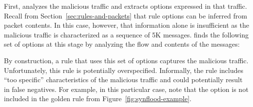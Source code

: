 \documentclass[sigconf,review, anonymous]{acmart}
\begin{document}
First, \tname{} analyzes the malicious traffic and extracts options
expressed in that traffic. Recall from
Section~\ref{sec:rules-and-packets} that rule options can be inferred
from packet contents. In this case, however, that information alone is
insufficient as the malicious traffic is characterized as a sequence
of 5K
messages. \tname{} finds the following set of options at this stage by
analyzing the flow and contents of the messages:

\begin{figure}[h]
  \vspace{-2ex}
  
  \vspace{-2ex}  
\end{figure}


\noindent
By construction, a rule that uses this set of options captures the
malicious traffic. Unfortunately, this rule is potentially
overspecified. Informally, the rule includes ``too specific''
characteristics of the malicious traffic and could potentially result
in false negatives. For example, in this particular case, note that
the option  is not included in the golden rule
from Figure~\ref{fig:synflood-example}.
\end{document}
